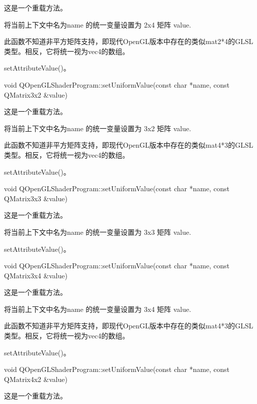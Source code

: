 这是一个重载方法。

将当前上下文中名为name 的统一变量设置为 2x4 矩阵 value.


\begin{notice}
此函数不知道非平方矩阵支持，即现代OpenGL版本中存在的类似mat2*4的GLSL类型。相反，它将统一视为vec4的数组。
\end{notice}

\begin{seeAlso}
setAttributeValue()。
\end{seeAlso}

void QOpenGLShaderProgram::setUniformValue(const char *name, const QMatrix3x2 \&value)

这是一个重载方法。

将当前上下文中名为name 的统一变量设置为 3x2 矩阵 value.


\begin{notice}
此函数不知道非平方矩阵支持，即现代OpenGL版本中存在的类似mat4*3的GLSL类型。相反，它将统一视为vec4的数组。
\end{notice}


\begin{seeAlso}
setAttributeValue()。
\end{seeAlso}

void QOpenGLShaderProgram::setUniformValue(const char *name, const QMatrix3x3 \&value)

这是一个重载方法。

将当前上下文中名为name 的统一变量设置为 3x3 矩阵 value.

\begin{seeAlso}
setAttributeValue()。
\end{seeAlso}

void QOpenGLShaderProgram::setUniformValue(const char *name, const QMatrix3x4 \&value)

这是一个重载方法。

将当前上下文中名为name 的统一变量设置为 3x4 矩阵 value.

\begin{notice}
此函数不知道非平方矩阵支持，即现代OpenGL版本中存在的类似mat4*3的GLSL类型。相反，它将统一视为vec4的数组。
\end{notice}

\begin{seeAlso}
setAttributeValue()。
\end{seeAlso}

void QOpenGLShaderProgram::setUniformValue(const char *name, const QMatrix4x2 \&value)

这是一个重载方法。

